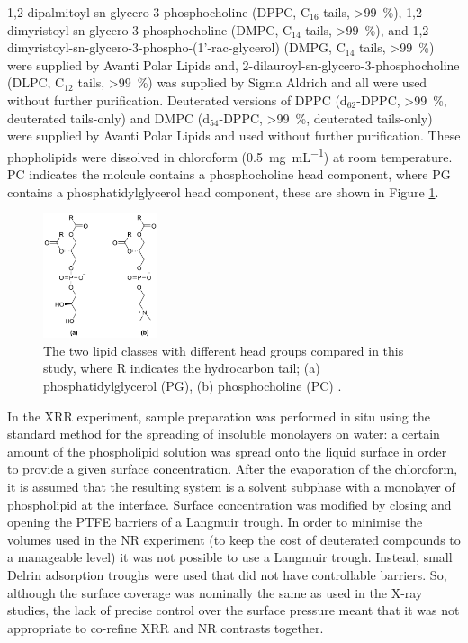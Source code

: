 \documentclass[amsmath,amssymb,twocolumn,superscriptaddress]{revtex4-1}
\begin{document}
1,2-dipalmitoyl-sn-glycero-3-phosphocholine (DPPC, C$_{16}$ tails, \SI{>99}{\percent}), 1,2-dimyristoyl-sn-glycero-3-phosphocholine (DMPC, C$_{14}$ tails, \SI{>99}{\percent}), and 1,2-dimyristoyl-sn-glycero-3-phospho-(1'-rac-glycerol) (DMPG, C$_{14}$ tails, \SI{>99}{\percent}) were supplied by Avanti Polar Lipids and, 2-dilauroyl-sn-glycero-3-phosphocholine (DLPC, C$_{12}$ tails, \SI{>99}{\percent}) was supplied by Sigma Aldrich and all were used without further purification.
Deuterated versions of DPPC (d$_{62}$-DPPC, \SI{>99}{\percent}, deuterated tails-only) and DMPC (d$_{54}$-DPPC, \SI{>99}{\percent}, deuterated tails-only) were supplied by Avanti Polar Lipids and used without further purification.
These phopholipids were dissolved in chloroform (\SI{0.5}{\milli\gram\per\milli\liter}) at room temperature.
PC indicates the molcule contains a phosphocholine head component, where PG contains a phosphatidylglycerol head component, these are shown in Figure \ref{fig:heads}.
%
\begin{figure}
\includegraphics[width=0.3\textwidth]{figures/head_groups}
\caption{\label{fig:heads}\small The two lipid classes with different head
groups compared in this study, where R indicates the hydrocarbon tail;
(a) phosphatidylglycerol (PG), (b) phosphocholine (PC) \cite{SI2019}.}
\end{figure}
%

In the XRR experiment, sample preparation was performed in situ using the standard method for the spreading of insoluble monolayers on water: a certain amount of the phospholipid solution was spread onto the liquid surface in order to provide a given surface concentration.
After the evaporation of the chloroform, it is assumed that the resulting system is a solvent subphase with a monolayer of phospholipid at the interface.
Surface concentration was modified by closing and opening the PTFE barriers of a Langmuir trough.
In order to minimise the volumes used in the NR experiment (to keep the cost of deuterated compounds to a manageable level) it was not possible to use a Langmuir trough.
Instead, small Delrin adsorption troughs were used that did not have controllable barriers.
So, although the surface coverage was nominally the same as used in the X-ray studies, the lack of precise control over the surface pressure meant that it was not appropriate to co-refine XRR and NR contrasts together.
\end{document}
